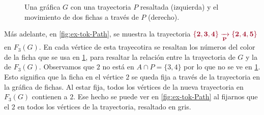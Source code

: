 \begin{figure}[ht!]
    \caption{Una gr\'afica $G$ con una trayectoria $P$ resaltada (izquierda) y
     el movimiento de dos fichas a trav\'es de $P$ (derecho).}
    \label{fig:ex-tok-aux}
\end{figure}
    
M\'as adelante, en \cref{fig:ex-tok-Path}, se muestra la trayectoria
${\color{vino}\bf \{2,3,4\}\xrightarrow[P]{}\{2,4,5\}}$ en $F_3(G)$. En cada
v\'ertice de esta trayecotira se resaltan los n\'umeros del color de la ficha
que se usa en \cref{fig:ex-tok-aux}, para resaltar la relaci\'on entre
la trayectoria de $G$ y la de $F_3(G)$. Observamos que $2$ no est\'a en $A \cap
P =\{3,4\}$ por lo que no se ve en \cref{fig:ex-tok-aux}. Esto significa que la
ficha en el v\'ertice $2$ se queda fija a trav\'es de la trayectoria en la
gr\'afica de fichas. Al estar fija, todos los v\'ertices de la
nueva trayectoria en $F_3(G)$ contienen a $2$. Ese hecho se puede ver en \cref{fig:ex-tok-Path} al fijarnos que
el $2$ en todos los v\'ertices de la trayectoria, resaltado en gris.

